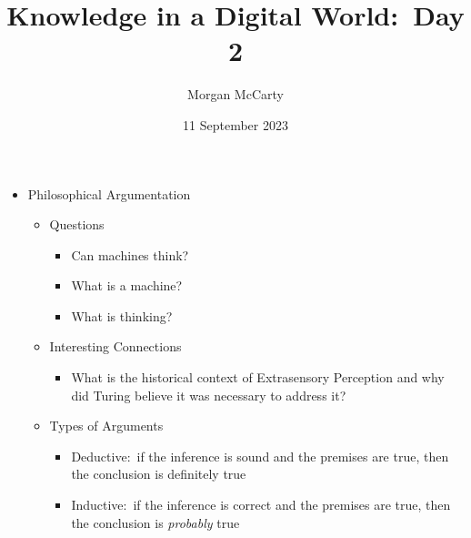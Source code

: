\documentclass[12pt]{article}
\title{
    Knowledge in a Digital World:\ Day 2}
\author{Morgan McCarty}
\date{11 September 2023}
\begin{document}
    \maketitle

    \begin{itemize}
        \item Philosophical Argumentation
        \begin{itemize}
            \item Questions
            \begin{itemize}
                \item Can machines think?
                \item What is a machine?
                \item What is thinking?
            \end{itemize}
            \item Interesting Connections
            \begin{itemize}
                \item What is the historical context of Extrasensory Perception and why did Turing believe it was necessary to address it?
            \end{itemize}
            \item Types of Arguments
            \begin{itemize}
                \item Deductive:\ if the inference is sound and the premises are true, then the conclusion is definitely true
                \item Inductive:\ if the inference is correct and the premises are true, then the conclusion is \textit{probably} true
            \end{itemize}
        \end{itemize}
    \end{itemize}
\end{document}
